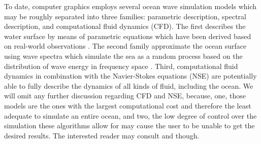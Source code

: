 To date, computer graphics employs several ocean wave simulation models which
may be roughly separated into three families: parametric description, spectral
description, and computational fluid dynamics (CFD). The first describes the water
surface by means of parametric equations which have been derived based on
real-world observations \citep{Gerstner:1809,Rankine:1863,Biesel:1952}.
The second family approximate the ocean surface using wave spectra which
simulate the sea as a random process based on the distribution of wave energy
in frequency space \citep{book:kinsman2002wind}.
Third, computational fluid dynamics in combination with the Navier-Stokes
equations (NSE) are potentially able to fully describe the dynamics of all kinds of
fluid, including the ocean. We will omit any further discussion regarding CFD and NSE,
because, one, those models are the ones with the largest computational cost and therefore
the least adequate to simulate an entire ocean, and two,
the low degree of control over the simulation these algorithms allow for
may cause the user to be unable to get the desired results.
The interested reader may consult \citet{Bridson:2015} and \citet{egstar:2014} though.
%
